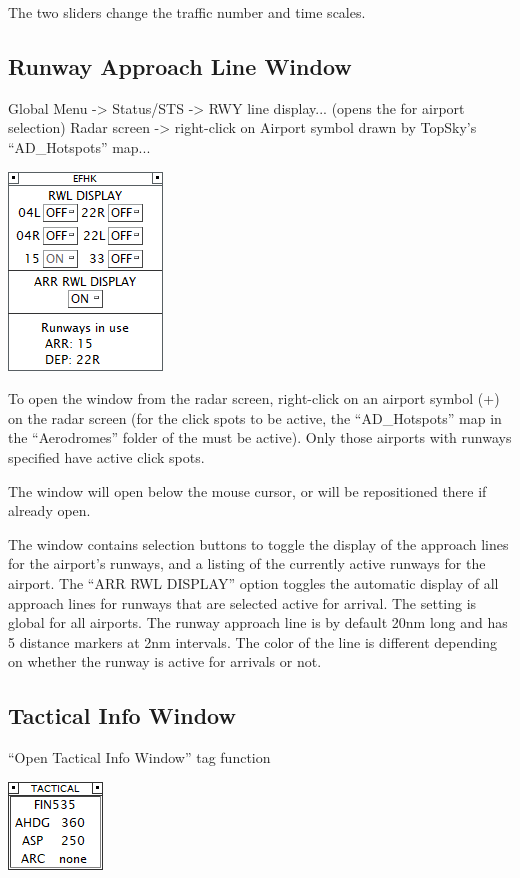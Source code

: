 \documentclass[11pt,a4paper]{memoir}
\begin{document}
The two sliders change the traffic number and time scales.

\subsection{Runway Approach Line Window}
\label{win:ralw}

Global Menu -> Status/STS -> RWY line display... (opens the \textit{} for airport selection)
Radar screen -> right-click on Airport symbol drawn by TopSky’s “AD\_Hotspots” map...

\includegraphics{img/rwydsp.png}

To open the window from the radar screen, right-click on an airport symbol (+) on the radar screen (for the click spots to be active, the “AD\_Hotspots” map in the “Aerodromes” folder of the \textit{} must be active). Only those airports with runways specified have active click spots.

The window will open below the mouse cursor, or will be repositioned there if already open.

The window contains selection buttons to toggle the display of the approach lines for the airport’s runways, and a listing of the currently active runways for the airport. The “ARR RWL DISPLAY” option toggles the automatic display of all approach lines for runways that are selected active for arrival. The setting is global for all airports. The runway approach line is by default 20nm long and has 5 distance markers at 2nm intervals. The color of the line is different depending on whether the runway is active for arrivals or not.

\subsection{Tactical Info Window}
\label{win:tiw}

“Open Tactical Info Window” tag function

\includegraphics{img/tiw.png}
\end{document}
